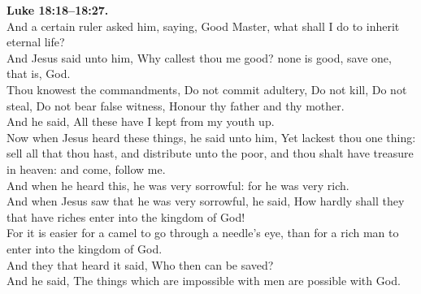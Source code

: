 \documentclass[12pt]{article} %
\begin{document}
{\begin{minipage}[t]{0.45\textwidth}
\textbf{Luke 18:18--18:27.}\\
And a certain ruler asked him, saying, Good Master, what shall I do to inherit eternal life?\\
And Jesus said unto him, Why callest thou me good? none is good, save one, that is, God.\\
Thou knowest the commandments, Do not commit adultery, Do not kill, Do not steal, Do not bear false witness, Honour thy father and thy mother.\\
And he said, All these have I kept from my youth up.\\
Now when Jesus heard these things, he said unto him, Yet lackest thou one thing: sell all that thou hast, and distribute unto the poor, and thou shalt have treasure in heaven: and come, follow me.\\
And when he heard this, he was very sorrowful: for he was very rich.\\
And when Jesus saw that he was very sorrowful, he said, How hardly shall they that have riches enter into the kingdom of God!\\
For it is easier for a camel to go through a needle's eye, than for a rich man to enter into the kingdom of God.\\
And they that heard it said, Who then can be saved?\\
And he said, The things which are impossible with men are possible with God.\\

\end{minipage}}
\vspace*{\fill}
\newpage
\huge%
\vspace*{\fill}
\begin{spacing}{1.2}
\end{spacing}
\vspace*{\fill}
\end{document}
